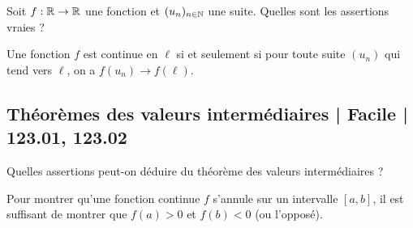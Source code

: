 \begin{question}

Soit $f : \mathbb{R} \to \mathbb{R}$ une fonction et $(u_n)_{n\in\mathbb{N}}$ une suite. Quelles sont les assertions vraies ?
\begin{answers}



  
\end{answers}
\begin{explanations}
Une fonction $f$ est continue en $\ell$ si et seulement si 
pour toute suite $(u_n)$ qui tend vers $\ell$, on a $f(u_n) \to f(\ell)$.
\end{explanations}
\end{question}


\subsection{Théorèmes des valeurs intermédiaires | Facile | 123.01, 123.02}


\begin{question}

Quelles assertions peut-on déduire du théorème des valeurs intermédiaires ?
\begin{answers}


    \good{$\ln(x+1)-x+1$ s'annule sur $[0,+\infty[$.}

\end{answers}
\begin{explanations}
Pour montrer qu'une fonction continue $f$ s'annule sur un intervalle $[a,b]$, il est suffisant de montrer que $f(a)>0$ et $f(b)<0$ (ou l'opposé).
\end{explanations}
\end{question}


